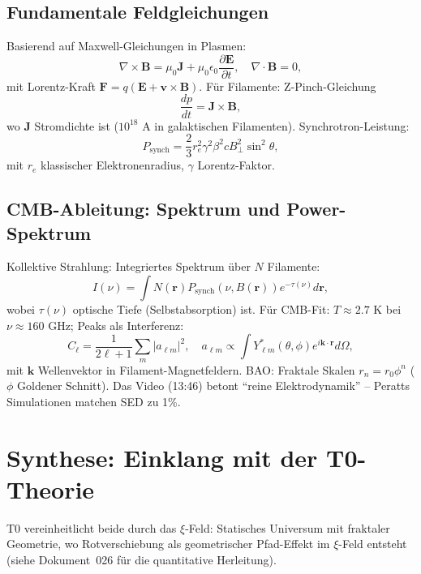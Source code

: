	\subsection{Fundamentale Feldgleichungen}
	Basierend auf Maxwell-Gleichungen in Plasmen:
	\begin{equation}
		\nabla \times \mathbf{B} = \mu_0 \mathbf{J} + \mu_0 \epsilon_0 \frac{\partial \mathbf{E}}{\partial t}, \quad \nabla \cdot \mathbf{B} = 0,
	\end{equation}
	mit Lorentz-Kraft $\mathbf{F} = q(\mathbf{E} + \mathbf{v} \times \mathbf{B})$. Für Filamente: Z-Pinch-Gleichung
	\begin{equation}
		\frac{dp}{dt} = \mathbf{J} \times \mathbf{B},
	\end{equation}
	wo $\mathbf{J}$ Stromdichte ist ($10^{18}$ A in galaktischen Filamenten). Synchrotron-Leistung:
	\begin{equation}
		P_{\text{synch}} = \frac{2}{3} r_e^2 \gamma^2 \beta^2 c B_\perp^2 \sin^2 \theta,
	\end{equation}
	mit $r_e$ klassischer Elektronenradius, $\gamma$ Lorentz-Faktor.
	\subsection{CMB-Ableitung: Spektrum und Power-Spektrum}
	Kollektive Strahlung: Integriertes Spektrum über $N$ Filamente:
	\begin{equation}
		I(\nu) = \int N(\mathbf{r}) P_{\text{synch}}(\nu, B(\mathbf{r})) e^{-\tau(\nu)} d\mathbf{r},
	\end{equation}
	wobei $\tau(\nu)$ optische Tiefe (Selbstabsorption) ist. Für CMB-Fit: $T \approx 2.7$ K bei $\nu \approx 160$ GHz; Peaks als Interferenz:
	\begin{equation}
		C_\ell = \frac{1}{2\ell + 1} \sum_m |a_{\ell m}|^2, \quad a_{\ell m} \propto \int Y_{\ell m}^*(\theta, \phi) e^{i \mathbf{k} \cdot \mathbf{r}} d\Omega,
	\end{equation}
	mit $\mathbf{k}$ Wellenvektor in Filament-Magnetfeldern. BAO: Fraktale Skalen $r_n = r_0 \phi^n$ ($\phi$ Goldener Schnitt).
	Das Video (13:46) betont ``reine Elektrodynamik'' -- Peratts Simulationen matchen SED zu 1\%.
	\section{Synthese: Einklang mit der T0-Theorie}
	T0 vereinheitlicht beide durch das $\xi$-Feld: Statisches Universum mit fraktaler Geometrie, wo Rotverschiebung als geometrischer Pfad-Effekt im $\xi$-Feld entsteht (siehe Dokument~026 für die quantitative Herleitung).
